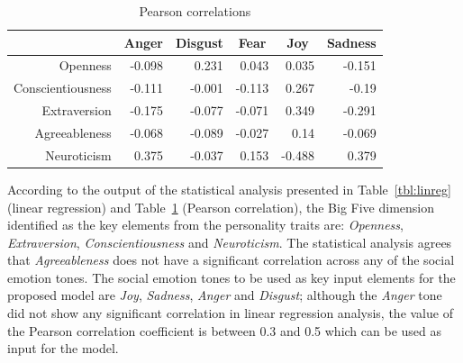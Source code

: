 \documentclass[graybox]{svmult}
\begin{document}
{{{\begin{table}[!ht]
\centering
\caption{Pearson correlations}
\begin{tabular}{@{}rrrrrr@{}}
\toprule
                  & \multicolumn{1}{c}{Anger}  & \multicolumn{1}{c}{Disgust} & \multicolumn{1}{c}{Fear}   & \multicolumn{1}{c}{Joy}    & \multicolumn{1}{c}{Sadness} \\ 
\midrule
Openness          & -0.098 & 0.231   & 0.043  & 0.035  & -0.151  \\
Conscientiousness & -0.111 & -0.001  & -0.113 & 0.267  & -0.19   \\
Extraversion      & -0.175 & -0.077  & -0.071 & 0.349  & -0.291  \\
Agreeableness     & -0.068 & -0.089  & -0.027 & 0.14   & -0.069  \\
Neuroticism       & 0.375  & -0.037  & 0.153  & -0.488 & 0.379   \\ 

\bottomrule
\end{tabular}
\label{tab:pearson}
\end{table}



According to the output of the statistical analysis presented in
Table~\ref{tbl:linreg} (linear regression) and Table~\ref{tab:pearson}
(Pearson correlation), the Big Five dimension identified as the key
elements from the personality traits are: {\emph{Openness}},
{\emph{Extraversion}}, {\emph{Conscientiousness}} and
{\emph{Neuroticism}}. The statistical analysis agrees that
{\emph{Agreeableness}} does not have a significant correlation across
any of the social emotion tones. The social emotion tones to be used
as key input elements for the proposed model are {\emph{Joy}},
{\emph{Sadness}}, {\emph{Anger}} and {\emph{Disgust}}; although the
{\emph{Anger}} tone did not show any significant correlation in linear
regression analysis, the value of the Pearson correlation coefficient
is between 0.3 and 0.5 which can be used as input for the model.


}}}
\end{document}
